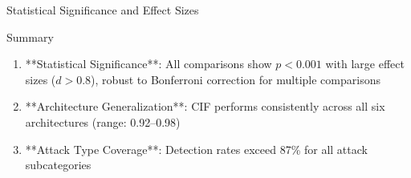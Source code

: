 \documentclass[
  ignorenonframetext,
]{beamer}
\begin{document}
\begin{frame}[fragile]{Statistical Significance and Effect Sizes}
\begin{block}{Summary}
\protect{}\label{sec:stats-summary}
\begin{enumerate}
\item **Statistical Significance**: All comparisons show $p < 0.001$ with large effect sizes ($d > 0.8$), robust to Bonferroni correction for multiple comparisons
\item **Architecture Generalization**: CIF performs consistently across all six architectures (range: 0.92--0.98)
\item **Attack Type Coverage**: Detection rates exceed 87\% for all attack subcategories
\end{enumerate}
\end{block}
\end{frame}
\end{document}

